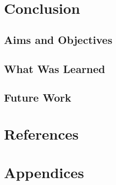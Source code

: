 \documentclass[12pt]{article}
\begin{document}
    \section{Conclusion}
    \subsection{Aims and Objectives}
    \subsection{What Was Learned}
    \subsection{Future Work}

    \newpage
    \section{References}
    

    \section{Appendices}
\end{document}
